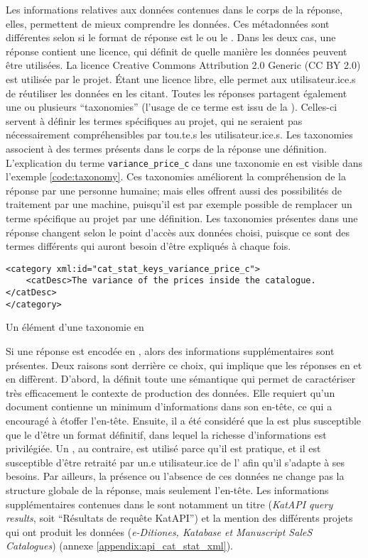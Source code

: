Les informations relatives aux données contenues dans le corps de la réponse, elles, permettent de mieux comprendre les données. Ces métadonnées sont différentes selon si le format de réponse est le \json{} ou le \tei{}. Dans les deux cas, une réponse contient une licence, qui définit de quelle manière les données peuvent être utilisées. La licence Creative Commons Attribution 2.0 Generic (CC BY 2.0) est utilisée par le projet. Étant une licence libre, elle permet aux utilisateur.ice.s de réutiliser les données en les citant. Toutes les réponses partagent également une ou plusieurs \enquote{taxonomies} (l'usage de ce terme est issu de la \tei{}). Celles-ci servent à définir les termes spécifiques au projet, qui ne seraient pas nécessairement compréhensibles par tou.te.s les utilisateur.ice.s. Les taxonomies associent à des termes présents dans le corps de la réponse une définition. L'explication du terme \texttt{variance\_price\_c} dans une taxonomie en \tei{} est visible dans l'exemple \ref{code:taxonomy}. Ces taxonomies améliorent la compréhension de la réponse par une personne humaine; mais elles offrent aussi des possibilités de traitement par une machine, puisqu'il est par exemple possible de remplacer un terme spécifique au projet par une définition. Les taxonomies présentes dans une réponse changent selon le point d'accès aux données choisi, puisque ce sont des termes différents qui auront besoin d'être expliqués à chaque fois.

\begin{listing}[h]
	\begin{verbatim}
<category xml:id="cat_stat_keys_variance_price_c">
	<catDesc>The variance of the prices inside the catalogue.</catDesc>
</category>
	\end{verbatim}
	\caption{Un élément d'une taxonomie en \tei{}}
	\label{code:taxonomy}
\end{listing}

Si une réponse est encodée en \tei{}, alors des informations supplémentaires sont présentes. Deux raisons sont derrière ce choix, qui implique que les réponses en \json{} et en \tei{} diffèrent. D'abord, la \tei{} définit toute une sémantique qui permet de caractériser très efficacement le contexte de production des données. Elle requiert qu'un document contienne un minimum d'informations dans son en-tête, ce qui a encouragé à étoffer l'en-tête. Ensuite, il a été considéré que la \tei{} est plus susceptible que le \json{} d'être un format définitif, dans lequel la richesse d'informations est privilégiée. Un \json{}, au contraire, est utilisé parce qu'il est pratique, et il est susceptible d'être retraité par un.e utilisateur.ice de l'\api{} afin qu'il s'adapte à ses besoins. Par ailleurs, la présence ou l'absence de ces données ne change pas la structure globale de la réponse, mais seulement l'en-tête. Les informations supplémentaires contenues dans le \tei{} sont notamment un titre (\textit{KatAPI query results}, soit \enquote{Résultats de requête KatAPI}) et la mention des différents projets qui ont produit les données (\textit{e-Ditiones, Katabase et Manuscript SaleS Catalogues}) (annexe \ref{appendix:api_cat_stat_xml}).

